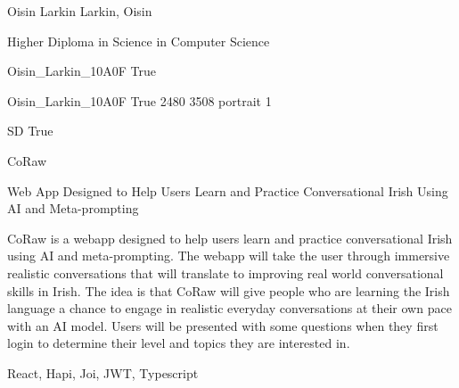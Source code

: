 \documentclass[twoside]{report}
\begin{document}
\begingroup{}\relax



\def\Key{Oisin_Larkin_10A0F}

{Oisin Larkin}
{Larkin, Oisin}

{Higher Diploma in Science in Computer Science}

{Oisin_Larkin_10A0F}
{True}

{Oisin_Larkin_10A0F}
{True}
{2480}
{3508}
{portrait}
{1}

{SD}
{True}

{CoRaw}

{Web App Designed to Help Users Learn and Practice Conversational Irish Using AI and Meta-prompting}

{CoRaw is a webapp designed to help users learn and practice conversational Irish using AI and meta-prompting. The webapp will take the user through immersive realistic conversations that will translate to improving real world conversational skills in Irish. The idea is that CoRaw will give people who are learning the Irish language a chance to engage in realistic everyday conversations at their own pace with an AI model. Users will be presented with some questions when they first login to determine their level and topics they are interested in.}

{React, Hapi, Joi, JWT, Typescript}
\end{document}
